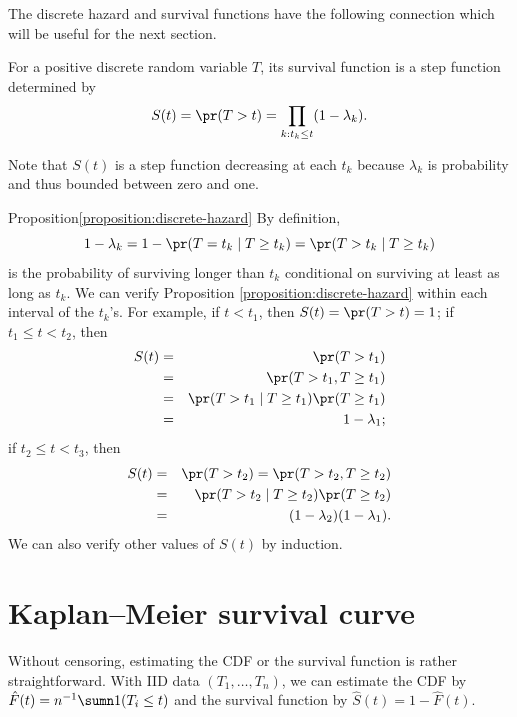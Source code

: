 The discrete hazard and survival functions have the following
connection which will be useful for the next section. 


\begin{proposition}
\label{proposition:discrete-hazard}For a positive discrete random variable
$T$, its survival function is a step function determined by
\[
S(t)=\pr(T>t)=\prod_{k:t_{k}\leq t}(1-\lambda_{k}).
\]
\end{proposition}


Note that $S(t)$ is a step function decreasing at each $t_k$ because $\lambda_k$ is probability and thus bounded between zero and one. 


\begin{myproof}{Proposition}{\ref{proposition:discrete-hazard}}
By definition, 
\[
1-\lambda_{k}=1 - \pr(T=t_{k}\mid T\geq t_{k})=\pr(T>t_{k}\mid T\geq t_{k})
\]
is the probability of surviving longer than $t_{k}$ conditional on
surviving at least as long as $t_{k}$. We can verify Proposition
\ref{proposition:discrete-hazard} within each interval of the $t_{k}$'s.
For example, if $t<t_{1}$, then $S(t)=\pr(T>t)=1$; if $t_{1}\leq t<t_{2}$,
then 
\begin{eqnarray*}
S(t) &=&\pr(T>t_{1}) \\
&=& \pr(T>t_{1}, T\geq t_{1}) \\
&=&\pr(T>t_{1}\mid T\geq t_{1}) \pr(T\geq t_{1}) \\
&=&1-\lambda_{1};
\end{eqnarray*}
if $t_{2}\leq t<t_{3}$, then 
\begin{eqnarray*}
S(t) &=&\pr(T>t_{2})=\pr(T>t_{2}, T \geq t_{2}) \\
&=&\pr(T>t_{2}\mid T\geq t_{2})\pr(T\geq t_2)\\
&=&(1-\lambda_{2})(1-\lambda_{1}).
\end{eqnarray*}
We can also verify other values of $S(t)$ by induction. 
\end{myproof}
%

\section{Kaplan--Meier survival curve}


Without censoring, estimating the CDF or the survival function is rather straightforward. With IID data $(T_1, \ldots, T_n)$, we can estimate the CDF by $\hat{F}(t) =  n^{-1} \sumn 1(T_i \leq t) $ and the survival function by $\hat{S}(t) = 1 - \hat{F}(t)$. 




